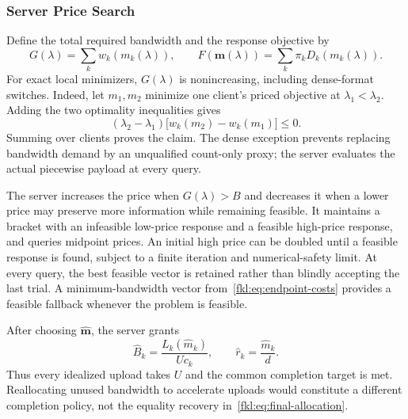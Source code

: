 \subsubsection{Server Price Search}
Define the total required bandwidth and the response objective by
\begin{equation}
 G(\lambda)=\sum_kw_k(m_k(\lambda)),\qquad
 F(\mathbf m(\lambda))=\sum_k\pi_kD_k(m_k(\lambda)).
 \label{fkl:eq:demand}
\end{equation}
For exact local minimizers, $G(\lambda)$ is nonincreasing, including dense-format switches. Indeed, let $m_1,m_2$ minimize one client's priced objective at $\lambda_1<\lambda_2$. Adding the two optimality inequalities gives
\begin{equation}
 (\lambda_2-\lambda_1)\big[w_k(m_2)-w_k(m_1)\big]\le0.
 \label{fkl:eq:monotonicity}
\end{equation}
Summing over clients proves the claim. The dense exception prevents replacing bandwidth demand by an unqualified count-only proxy; the server evaluates the actual piecewise payload at every query.

The server increases the price when $G(\lambda)>B$ and decreases it when a lower price may preserve more information while remaining feasible. It maintains a bracket with an infeasible low-price response and a feasible high-price response, and queries midpoint prices. An initial high price can be doubled until a feasible response is found, subject to a finite iteration and numerical-safety limit. At every query, the best feasible vector is retained rather than blindly accepting the last trial. A minimum-bandwidth vector from~\eqref{fkl:eq:endpoint-costs} provides a feasible fallback whenever the problem is feasible.

After choosing $\widehat{\mathbf m}$, the server grants
\begin{equation}
 \widehat B_k=\frac{L_k(\widehat m_k)}{Uc_k},\qquad
 \widehat r_k=\frac{\widehat m_k}{d}.
 \label{fkl:eq:final-allocation}
\end{equation}
Thus every idealized upload takes $U$ and the common completion target is met. Reallocating unused bandwidth to accelerate uploads would constitute a different completion policy, not the equality recovery in~\eqref{fkl:eq:final-allocation}.

